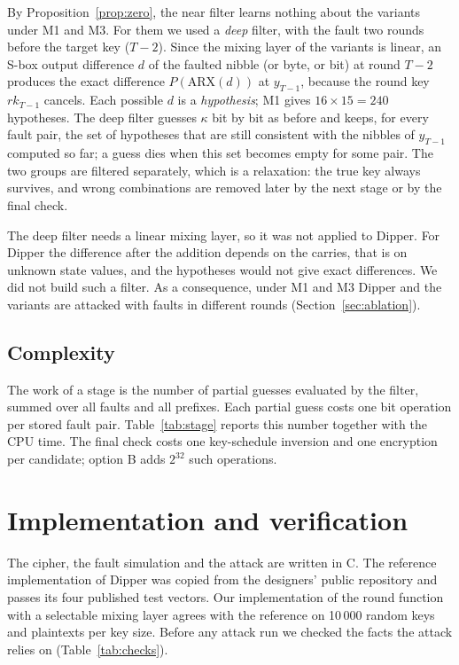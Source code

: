 \documentclass[pdflatex,sn-mathphys-num]{sn-jnl}
\theoremstyle{thmstyleone}%
\theoremstyle{thmstylethree}%
\newcommand{\rk}{\mathit{rk}}
\begin{document}
By Proposition~\ref{prop:zero}, the near filter learns nothing about the variants under M1 and M3. For
them we used a \emph{deep} filter, with the fault two rounds before the target key ($T-2$). Since the
mixing layer of the variants is linear, an S-box output difference $d$ of the faulted nibble (or byte,
or bit) at round $T-2$ produces the exact difference $P(\mathrm{ARX}(d))$ at $y_{T-1}$, because the round
key $\rk_{T-1}$ cancels. Each possible $d$ is a \emph{hypothesis}; M1 gives $16\times 15=240$ hypotheses.
The deep filter guesses $\kappa$ bit by bit as before and keeps, for every fault pair, the set of
hypotheses that are still consistent with the nibbles of $y_{T-1}$ computed so far; a guess dies when this
set becomes empty for some pair. The two groups are filtered separately, which is a relaxation: the
true key always survives, and wrong combinations are removed later by the next stage or by the final
check.

The deep filter needs a linear mixing layer, so it was not applied to Dipper. For Dipper the difference
after the addition depends on the carries, that is on unknown state values, and the hypotheses would
not give exact differences. We did not build such a filter. As a consequence, under M1 and M3 Dipper and
the variants are attacked with faults in different rounds (Section~\ref{sec:ablation}).

\subsection{Complexity}

The work of a stage is the number of partial guesses evaluated by the filter, summed over all faults
and all prefixes. Each partial guess costs one bit operation per stored fault pair. Table~\ref{tab:stage}
reports this number together with the CPU time. The final check costs one key-schedule inversion and one
encryption per candidate; option B adds $2^{32}$ such operations.

\section{Implementation and verification}\label{sec:impl}

The cipher, the fault simulation and the attack are written in C. The reference implementation of Dipper
was copied from the designers' public repository and passes its four published test vectors. Our
implementation of the round function with a selectable mixing layer agrees with the reference on 10\,000
random keys and plaintexts per key size. Before any attack run we checked the facts the attack relies
on (Table~\ref{tab:checks}).
\end{document}
